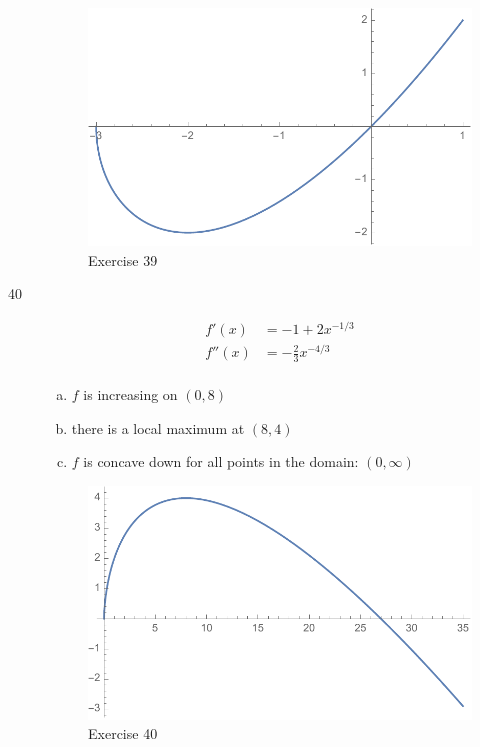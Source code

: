 \documentclass[letterpaper, landscape]{exam}
\begin{document}
\begin{description}
      \begin{figure}[H]
        \centering
        \includegraphics[scale = 0.6]{ex39.pdf}
        \caption{Exercise 39}
        \label{fig:ex39}
      \end{figure}

    \newpage

    \item[40]
      \begin{align*}
        f'(x)  & = -1 + 2x^{-1/3} \\
        f''(x) & = -\frac{2}{3} x^{-4/3} \\
      \end{align*}

      \begin{enumerate}[(a)]
        \item $f$ is increasing on $(0, 8)$

        \item there is a local maximum at $(8, 4)$ 

        \item $f$ is concave down for all points in the domain: $(0, \infty)$

      \end{enumerate}

      \begin{figure}[H]
        \centering
        \includegraphics[scale = 0.6]{ex40.pdf}
        \caption{Exercise 40}
        \label{fig:ex40}
      \end{figure}

  \end{description}
\end{document}
